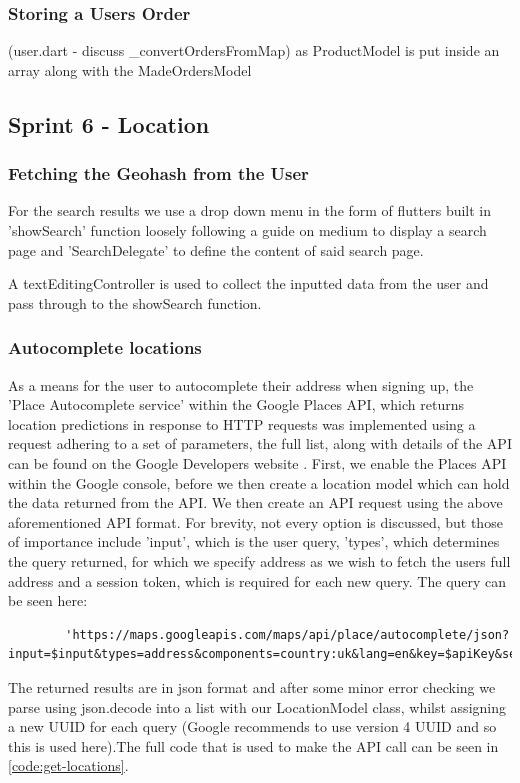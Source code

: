 \documentclass[12pt]{article}
\begin{document}
		\subsubsection{Storing a Users Order}
		(user.dart - discuss \_convertOrdersFromMap) as ProductModel is put inside an array along with the MadeOrdersModel
	
	\subsection{Sprint 6 - Location}
	\label{sprint-location}	
	\subsubsection{Fetching the Geohash from the User}
	For the search results we use a drop down menu in the form of flutters built in 'showSearch' function loosely following a guide on medium \cite{sheanLocationSearchAutocomplete2020} to display a search page and 'SearchDelegate' to define the content of said search page.
	
	A textEditingController is used to collect the inputted data from the user and pass through to the showSearch function.
	
	\noindent
	
	
	
	\subsubsection{Autocomplete locations}
	As a means for the user to autocomplete their address when signing up, the 'Place Autocomplete service' within the Google Places API, which returns location predictions in response to HTTP requests was implemented using a request adhering to a set of parameters, the full list, along with details of the API can be found on the Google Developers website \cite{PlaceAutocompleteRequests}.
	First, we enable the Places API within the Google console, before we then create a location model which can hold the data returned from the API. We then create an API request using the above aforementioned API format. For brevity, not every option is discussed, but those of importance include 'input', which is the user query, 'types', which determines the query returned, for which we specify address as we wish to fetch the users full address and a session token, which is required for each new query. The query can be seen here:
	\begin{lstlisting}
		'https://maps.googleapis.com/maps/api/place/autocomplete/json?input=$input&types=address&components=country:uk&lang=en&key=$apiKey&sessiontoken=$sessionToken'
	\end{lstlisting}
	The returned results are in json format and after some minor error checking we parse using json.decode into a list with our LocationModel class, whilst assigning a new UUID for each query (Google recommends to use version 4 UUID and so this is used here).The full code that is used to make the API call can be seen in \autoref{code:get-locations}.
	
\end{document}
